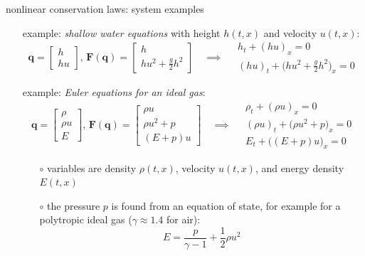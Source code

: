 \documentclass[10pt,hyperref,dvipsnames]{beamer}
\newcommand{\bq}{\mathbf{q}}
\newcommand{\bF}{\mathbf{F}}
\begin{document}
\begin{frame}{nonlinear conservation laws: system examples}

\begin{itemize}
\setlength{\itemindent}{11mm}
\item[example:] \emph{shallow water equations} with height $h(t,x)$ and velocity $u(t,x)$:
        $$\bq = \begin{bmatrix} h \\ hu \end{bmatrix}, \, \bF(\bq) = \begin{bmatrix} h \\ h u^2 + \frac{g}{2} h^2 \end{bmatrix} \quad \implies \quad \begin{matrix} h_t + (hu)_x = 0 \\ (hu)_t + \Big(h u^2 + \frac{g}{2} h^2\Big)_x = 0 \end{matrix}$$
\item[example:] \emph{Euler equations for an ideal gas}:
        $$\bq = \begin{bmatrix} \rho \\ \rho u \\ E \end{bmatrix}, \, \bF(\bq) = \begin{bmatrix} \rho u \\ \rho u^2 + p \\ (E+p) u \end{bmatrix} \quad \implies \quad \begin{matrix} \rho_t + (\rho u)_x = 0 \\ (\rho u)_t + \Big(\rho u^2 + p\Big)_x = 0 \\ E_t + \Big((E+p) u\Big)_x = 0 \end{matrix}$$
    \begin{itemize}
    \item[$\circ$] variables are density $\rho(t,x)$, velocity $u(t,x)$, and energy density $E(t,x)$
    \item[$\circ$] the pressure $p$ is found from an equation of state, for example for a polytropic ideal gas ($\gamma \approx 1.4$ for air):
        $$E = \frac{p}{\gamma - 1} + \frac{1}{2} \rho u^2$$
    \end{itemize}
\end{itemize}
\end{frame}
\end{document}
